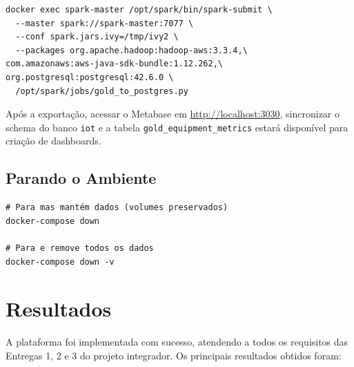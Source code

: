 \begin{verbatim}
docker exec spark-master /opt/spark/bin/spark-submit \
  --master spark://spark-master:7077 \
  --conf spark.jars.ivy=/tmp/ivy2 \
  --packages org.apache.hadoop:hadoop-aws:3.3.4,\
com.amazonaws:aws-java-sdk-bundle:1.12.262,\
org.postgresql:postgresql:42.6.0 \
  /opt/spark/jobs/gold_to_postgres.py
\end{verbatim}

Após a exportação, acessar o Metabase em \url{http://localhost:3030}, sincronizar
o schema do banco \texttt{iot} e a tabela \texttt{gold\_equipment\_metrics} estará
disponível para criação de dashboards.

\subsection{Parando o Ambiente}

\begin{verbatim}
# Para mas mantém dados (volumes preservados)
docker-compose down

# Para e remove todos os dados
docker-compose down -v
\end{verbatim}

\section{Resultados}

A plataforma foi implementada com sucesso, atendendo a todos os requisitos das
Entregas 1, 2 e 3 do projeto integrador. Os principais resultados obtidos foram:

